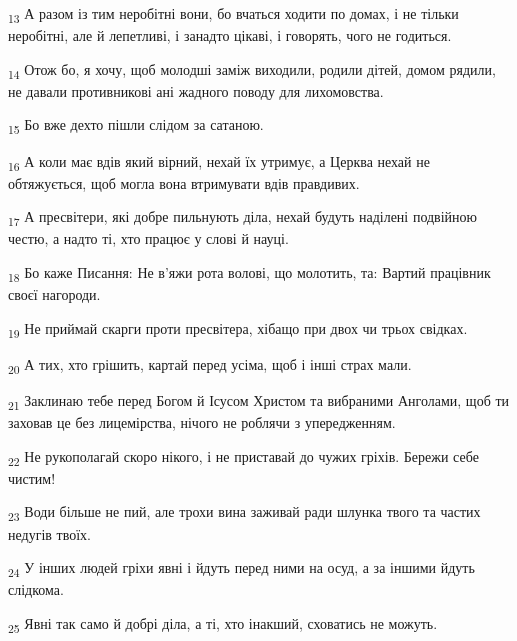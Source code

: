 \begin{tcolorbox}
\textsubscript{13} А разом із тим неробітні вони, бо вчаться ходити по домах, і не тільки неробітні, але й лепетливі, і занадто цікаві, і говорять, чого не годиться.
\end{tcolorbox}
\begin{tcolorbox}
\textsubscript{14} Отож бо, я хочу, щоб молодші заміж виходили, родили дітей, домом рядили, не давали противникові ані жадного поводу для лихомовства.
\end{tcolorbox}
\begin{tcolorbox}
\textsubscript{15} Бо вже дехто пішли слідом за сатаною.
\end{tcolorbox}
\begin{tcolorbox}
\textsubscript{16} А коли має вдів який вірний, нехай їх утримує, а Церква нехай не обтяжується, щоб могла вона втримувати вдів правдивих.
\end{tcolorbox}
\begin{tcolorbox}
\textsubscript{17} А пресвітери, які добре пильнують діла, нехай будуть наділені подвійною честю, а надто ті, хто працює у слові й науці.
\end{tcolorbox}
\begin{tcolorbox}
\textsubscript{18} Бо каже Писання: Не в'яжи рота волові, що молотить, та: Вартий працівник своєї нагороди.
\end{tcolorbox}
\begin{tcolorbox}
\textsubscript{19} Не приймай скарги проти пресвітера, хібащо при двох чи трьох свідках.
\end{tcolorbox}
\begin{tcolorbox}
\textsubscript{20} А тих, хто грішить, картай перед усіма, щоб і інші страх мали.
\end{tcolorbox}
\begin{tcolorbox}
\textsubscript{21} Заклинаю тебе перед Богом й Ісусом Христом та вибраними Анголами, щоб ти заховав це без лицемірства, нічого не роблячи з упередженням.
\end{tcolorbox}
\begin{tcolorbox}
\textsubscript{22} Не рукополагай скоро нікого, і не приставай до чужих гріхів. Бережи себе чистим!
\end{tcolorbox}
\begin{tcolorbox}
\textsubscript{23} Води більше не пий, але трохи вина заживай ради шлунка твого та частих недугів твоїх.
\end{tcolorbox}
\begin{tcolorbox}
\textsubscript{24} У інших людей гріхи явні і йдуть перед ними на осуд, а за іншими йдуть слідкома.
\end{tcolorbox}
\begin{tcolorbox}
\textsubscript{25} Явні так само й добрі діла, а ті, хто інакший, сховатись не можуть.
\end{tcolorbox}
